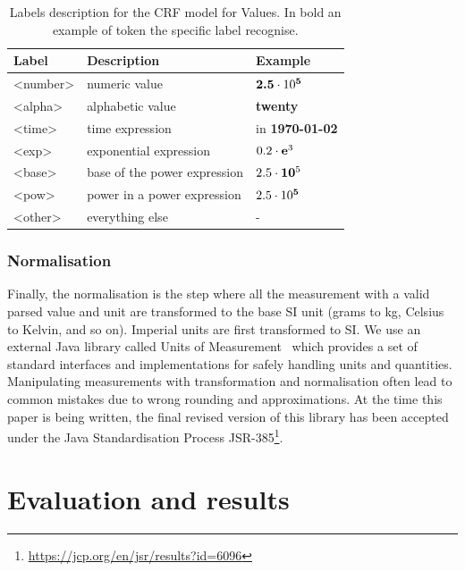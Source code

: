 \documentclass[sigconf]{acmart}
\begin{document}
\begin{table}[ht]
  \caption{Labels description for the CRF model for Values. In bold an example of token the specific label recognise.}
  \label{tab:values-model-labels}
  \begin{tabular}{lll}
    \toprule
    Label & Description & Example\\
    \midrule
    <number> & numeric value & $\textbf{2.5}\cdot10\textsuperscript{\textbf{5}}$ \\
    <alpha> & alphabetic value & \textbf{twenty} \\
    <time> & time expression  & in \textbf{1970-01-02}\\
    <exp> & exponential expression & $0.2\cdot\textbf{e}\textsuperscript{3}$ \\
    <base> & base of the power expression & $2.5\cdot\textbf{10}\textsuperscript{5}$\\
    <pow> & power in a power expression & $2.5\cdot10\textsuperscript{\textbf{5}}$ \\
    <other> & everything else & - \\
  \bottomrule
\end{tabular}
\end{table}

\subsubsection{Normalisation}

Finally, the normalisation is the step where all the measurement with a valid parsed value and unit are transformed to the base SI unit (grams to kg, Celsius to Kelvin, and so on). Imperial units are first transformed to SI. We use an external Java library called Units of Measurement~\cite{units_of_measurement} which provides a set of standard interfaces and implementations for safely handling units and quantities. Manipulating measurements with transformation and normalisation often lead to common mistakes due to wrong rounding and approximations. At the time this paper is being written, the final revised version of this library has been accepted under the Java Standardisation Process JSR-385\footnote{\url{https://jcp.org/en/jsr/results?id=6096}}. 

\section{Evaluation and results}
\label{sec:results}
\end{document}
